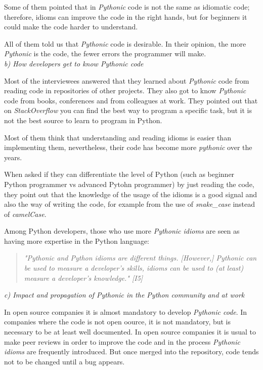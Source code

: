 \documentclass[a4paper]{article}
\begin{document}
Some of them pointed that in \textit{Pythonic} code is not the same as idiomatic code; therefore, idioms can improve the code in the right hands, but for beginners it could make the code harder to understand.

All of them told us that \textit{Pythonic} code is desirable. In their opinion, the more \textit{Pythonic} is the code, the fewer errors the programmer will make.
\\

\textit{b) How developers get to know \textit{Pythonic} code}

Most of the interviewees answered that they learned about \textit{Pythonic} code from reading code in repositories of other projects. They also got to know \textit{Pythonic} code from books, conferences and from colleagues at work.
They pointed out that on \textit{StackOverflow} you can find the best way to program a specific task, but it is not the best source to learn to program in Python.

Most of them think that understanding and reading idioms is easier than implementing them, nevertheless, their code has become more \textit{pythonic} over the years.

When asked if they can differentiate the level of Python (such as beginner Python programmer vs advanced Pytohn programmer) by just reading the code, they point out that the knowledge of the usage of the idioms is a good signal and also the way of writing the code, for example from the use of \textit{snake\_case} instead of \textit{camelCase}.


Among Python developers, those who use more \textit{Pythonic idioms} are seen as having more expertise in the Python language:
\begin{quote}
\textit{
    "\textit{Pythonic} and Python idioms are different things. [However,] \textit{Pythonic} can be used to measure a developer’s skills, idioms can be used to (at least) measure a developer’s knowledge." [I5]
}
\end{quote}



\textit{c) Impact and propagation of \textit{Pythonic} in the Python community and at work}

In open source companies it is almost mandatory to develop \textit{Pythonic code}. In companies where the code is not open oource, it is not mandatory, but is necessary to be at least well documented. In open source companies it is usual to make peer reviews in order to improve the code and in the process \textit{Pythonic idioms} are frequently introduced. But once merged into the repository, code tends not to be changed until a bug appears.
\end{document}

